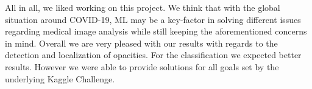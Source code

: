 All in all, we liked working on this project. We think that with the global situation around COVID-19, ML may be a key-factor in solving different issues regarding medical image analysis while still keeping the aforementioned concerns in mind. Overall we are very pleased with our results with regards to the detection and localization of opacities. For the classification we expected better results. However we were able to provide solutions for all goals set by the underlying Kaggle Challenge. 
